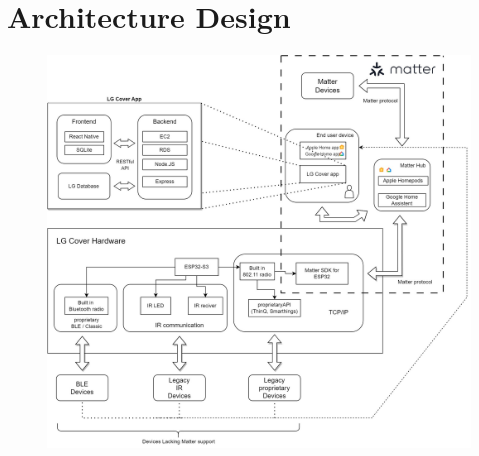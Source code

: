 \documentclass[conference]{IEEEtran}
\begin{document}
\section{\large{Architecture Design}}
\begin{figure}[H]\centering \includegraphics[scale=0.25]{images/structure.png}\end{figure}
\end{document}
